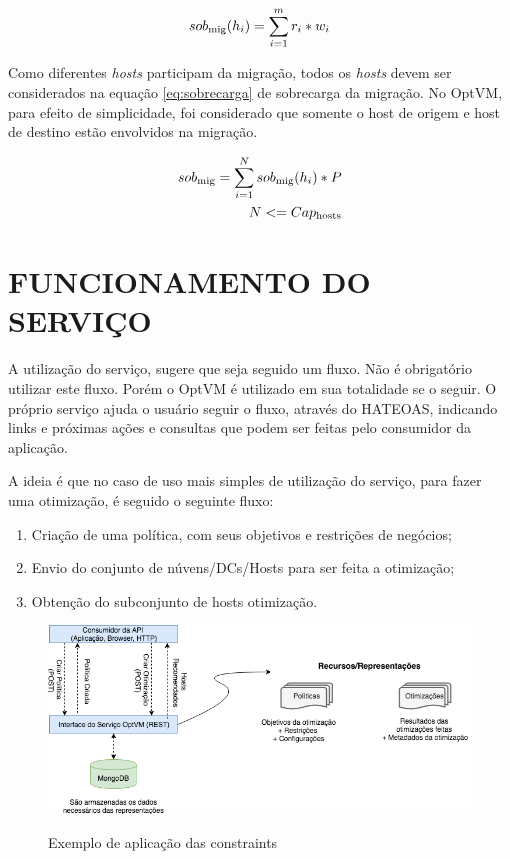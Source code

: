 \begin{equation}
sob\textsubscript{mig}(h_i) = \sum_{i=1}^{m}r_i * w_i
\label{eq:sobHi}
\end{equation}

Como diferentes \textit{hosts} participam da migração, todos os 
\textit{hosts} devem ser considerados na equação \ref{eq:sobrecarga} de 
sobrecarga da migração. No OptVM, para efeito de simplicidade, foi considerado
que somente o host de origem e host de destino estão envolvidos na migração.

\begin{equation}
\begin{split}
sob\textsubscript{mig} = \sum_{i=1}^{N}sob\textsubscript{mig}(h_i) * P  \\
N <= Cap\textsubscript{hosts}
\end{split}
\label{eq:sobrecarga}
\end{equation}

\section{FUNCIONAMENTO DO SERVIÇO}

A utilização do serviço, sugere que seja seguido um fluxo. Não é obrigatório
utilizar este fluxo. Porém o OptVM é utilizado em sua totalidade se o seguir. 
O próprio serviço ajuda o usuário seguir o fluxo, através do HATEOAS, indicando 
links e próximas ações e consultas que podem ser feitas pelo consumidor da aplicação.

A ideia é que no caso de uso mais simples de utilização do serviço, 
para fazer uma otimização, é seguido o seguinte fluxo:

\begin{enumerate}
 \item Criação de uma política, com seus objetivos e restrições de negócios;
 \item Envio do conjunto de núvens/DCs/Hosts para ser feita a otimização;
 \item Obtenção do subconjunto de hosts otimização.
\end{enumerate}

\begin{figure}[!htb]
  \centering
  \caption{Exemplo de aplicação das constraints}
  \includegraphics[width=1\textwidth]{./dados/figuras/overview.png}
  \label{fig:overview}
\end{figure}

